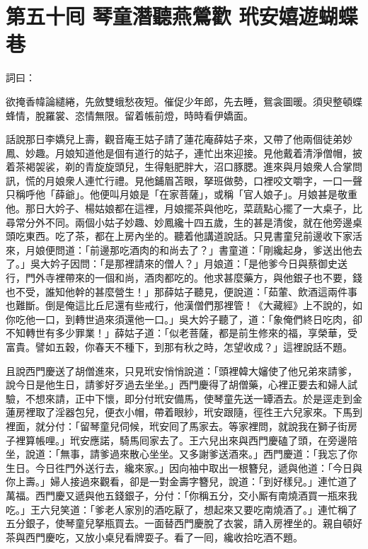 
\chapter*{第五十囘 琴童潛聽燕鶯歡 玳安嬉遊蝴蝶巷}


詞曰：

\begin{myquote} 
欲掩香幃論繾綣，先斂雙蛾愁夜短。催促少年郎，先去睡，鴛衾圖暖。須臾整頓蝶蜂情，脫羅裳、恣情無限。留着帳前燈，時時看伊嬌面。

\end{myquote} 

話說那日李嬌兒上壽，觀音庵王姑子請了蓮花庵薛姑子來，又帶了他兩個徒弟妙鳳、妙趣。月娘知道他是個有道行的姑子，連忙出來迎接。見他戴着清淨僧帽，披着茶褐袈裟，剃的青旋旋頭兒，生得魁肥胖大，沼口豚腮。進來與月娘衆人合掌問訊，慌的月娘衆人連忙行禮。見他鋪眉苫眼，拏班做勢，口裡咬文嚼字，一口一聲只稱呼他「薛爺」。他便叫月娘是「在家菩薩」，或稱「官人娘子」。月娘甚是敬重他。那日大妗子、楊姑娘都在這裡，月娘擺茶與他吃，菜蔬點心擺了一大桌子，比尋常分外不同。兩個小姑子妙趣、妙鳳纔十四五歲，生的甚是清俊，就在他旁邊桌頭吃東西。吃了茶，都在上房內坐的。聽着他講道說話。只見書童兒前邊收下家活來，月娘便問道：「前邊那吃酒肉的和尚去了？」書童道：「剛纔起身，爹送出他去了。」吳大妗子因問：「是那裡請來的僧人？」月娘道：「是他爹今日與蔡御史送行，門外寺裡帶來的一個和尚，酒肉都吃的。他求甚麼藥方，與他銀子也不要，錢也不受，誰知他幹的甚麼營生！」那薛姑子聽見，便說道：「茹葷、飲酒這兩件事也難斷。倒是俺這比丘尼還有些戒行，他漢僧們那裡管！《大藏經》上不說的，如你吃他一口，到轉世過來須還他一口。」吳大妗子聽了，道：「象俺們終日吃肉，卻不知轉世有多少罪業！」薛姑子道：「似老菩薩，都是前生修來的福，享榮華，受富貴。譬如五穀，你春天不種下，到那有秋之時，怎望收成？」這裡說話不題。

且說西門慶送了胡僧進來，只見玳安悄悄說道：「頭裡韓大嬸使了他兄弟來請爹，說今日是他生日，請爹好歹過去坐坐。」西門慶得了胡僧藥，心裡正要去和婦人試驗，不想來請，正中下懷，即分付玳安備馬，使琴童先送一罈酒去。於是逕走到金蓮房裡取了淫器包兒，便衣小帽，帶着眼紗，玳安跟隨，徑徃王六兒家來。下馬到裡面，就分付：「留琴童兒伺候，玳安囘了馬家去。等家裡問，就說我在獅子街房子裡算帳哩。」玳安應諾，騎馬囘家去了。王六兒出來與西門慶磕了頭，在旁邊陪坐，說道：「無事，請爹過來散心坐坐。又多謝爹送酒來。」西門慶道：「我忘了你生日。今日徃門外送行去，纔來家。」因向袖中取出一根簪兒，遞與他道：「今日與你上壽。」婦人接過來觀看，卻是一對金壽字簪兒，說道：「到好樣兒。」連忙道了萬福。西門慶又遞與他五錢銀子，分付：「你稱五分，交小厮有南燒酒買一瓶來我吃。」王六兒笑道：「爹老人家別的酒吃厭了，想起來又要吃南燒酒了。」連忙稱了五分銀子，使琴童兒拏瓶買去。一面替西門慶脫了衣裳，請入房裡坐的。親自頓好茶與西門慶吃，又放小桌兒看牌耍子。看了一囘，纔收拾吃酒不題。


